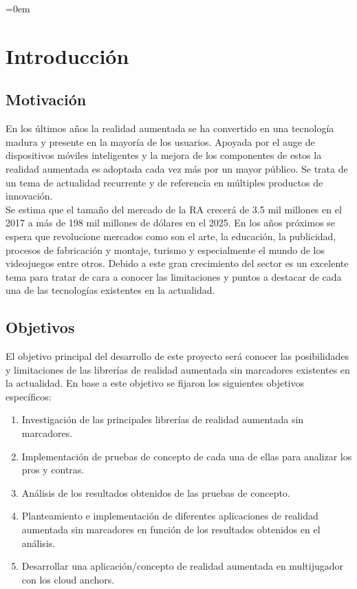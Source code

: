 \parindent=0em
\chapter{Introducción}
\noindent
\section{Motivación}
En los últimos años la realidad aumentada se ha convertido en una tecnología madura y presente en la mayoría de los usuarios. Apoyada por el auge de dispositivos móviles inteligentes y la mejora de los componentes de estos la realidad aumentada es adoptada cada vez más por un mayor público. Se trata de un tema de actualidad recurrente y de referencia en múltiples productos de innovación.\\
Se estima que el tamaño del mercado de la RA crecerá de 3.5 mil millones en el 2017 a más de 198 mil millones de dólares en el 2025.\cite{Statista} En los años próximos se espera que revolucione mercados como son el arte, la educación, la publicidad, procesos de fabricación y montaje, turismo y especialmente el mundo de los videojuegos entre otros. Debido a este gran crecimiento del sector es un excelente tema para tratar de cara a conocer las limitaciones y puntos a destacar de cada una de las tecnologías existentes en la actualidad. 
\section{Objetivos}
El objetivo principal del desarrollo de este proyecto será conocer las posibilidades y limitaciones de las librerías de realidad aumentada sin marcadores existentes en la actualidad. En base a este objetivo se fijaron los siguientes objetivos específicos:
\begin{enumerate}
\item Investigación de las principales librerías de realidad aumentada sin marcadores.
\item Implementación de pruebas de concepto de cada una de ellas para analizar los pros y contras.
\item Análisis de los resultados obtenidos de las pruebas de concepto.
\item Planteamiento e implementación de diferentes aplicaciones de realidad aumentada sin marcadores en función de los resultados obtenidos en el análisis.
\item Desarrollar una aplicación/concepto de realidad aumentada en multijugador con los cloud anchors.
\end{enumerate}

